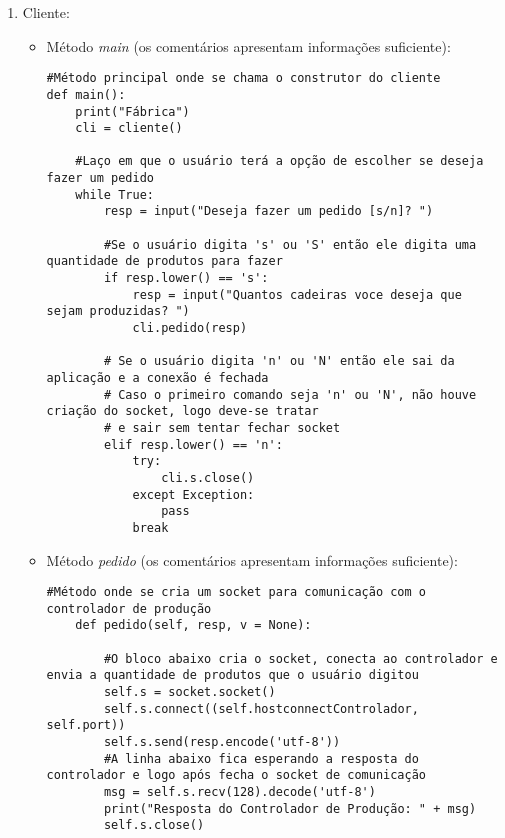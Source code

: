 \documentclass[brazil, a4paper,12pt]{article}
\begin{document}
\begin{enumerate}

\item Cliente:

\begin{itemize}

\item Método \emph{main} (os comentários apresentam informações suficiente):

\begin{lstlisting}[style=sd]
#Método principal onde se chama o construtor do cliente
def main():
    print("Fábrica")
    cli = cliente()

    #Laço em que o usuário terá a opção de escolher se deseja fazer um pedido
    while True:
        resp = input("Deseja fazer um pedido [s/n]? ")

        #Se o usuário digita 's' ou 'S' então ele digita uma quantidade de produtos para fazer
        if resp.lower() == 's':
            resp = input("Quantos cadeiras voce deseja que sejam produzidas? ")
            cli.pedido(resp)

        # Se o usuário digita 'n' ou 'N' então ele sai da aplicação e a conexão é fechada
        # Caso o primeiro comando seja 'n' ou 'N', não houve criação do socket, logo deve-se tratar
        # e sair sem tentar fechar socket
        elif resp.lower() == 'n':
            try:
                cli.s.close()
            except Exception:
                pass
            break

\end{lstlisting}

\item Método \emph{pedido} (os comentários apresentam informações suficiente):

\begin{lstlisting}[style=sd]
#Método onde se cria um socket para comunicação com o controlador de produção
    def pedido(self, resp, v = None):

        #O bloco abaixo cria o socket, conecta ao controlador e envia a quantidade de produtos que o usuário digitou
        self.s = socket.socket()
        self.s.connect((self.hostconnectControlador, self.port))
        self.s.send(resp.encode('utf-8'))
        #A linha abaixo fica esperando a resposta do controlador e logo após fecha o socket de comunicação
        msg = self.s.recv(128).decode('utf-8')
        print("Resposta do Controlador de Produção: " + msg)
        self.s.close()


\end{lstlisting}


\end{itemize}
\end{enumerate}
\end{document}
